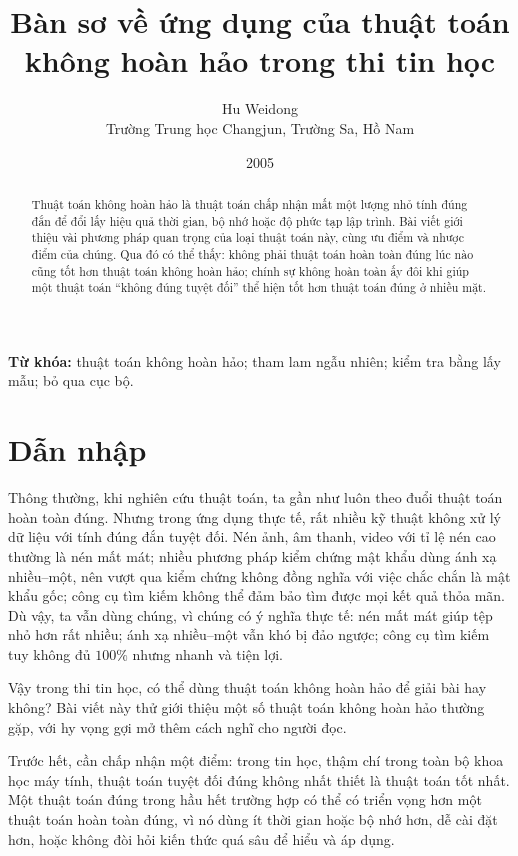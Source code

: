 \documentclass[11pt]{article}
\title{Bàn sơ về ứng dụng của thuật toán không hoàn hảo trong thi tin học}
\author{Hu Weidong\\Trường Trung học Changjun, Trường Sa, Hồ Nam}
\date{2005}
\begin{document}
\maketitle


\renewcommand{\abstractname}{Tóm tắt}
\begin{abstract}
Thuật toán không hoàn hảo là thuật toán chấp nhận mất một lượng nhỏ tính đúng
đắn để đổi lấy hiệu quả thời gian, bộ nhớ hoặc độ phức tạp lập trình. Bài viết
giới thiệu vài phương pháp quan trọng của loại thuật toán này, cùng ưu điểm và
nhược điểm của chúng. Qua đó có thể thấy: không phải thuật toán hoàn toàn đúng
lúc nào cũng tốt hơn thuật toán không hoàn hảo; chính sự không hoàn toàn ấy
đôi khi giúp một thuật toán ``không đúng tuyệt đối'' thể hiện tốt hơn thuật
toán đúng ở nhiều mặt.
\end{abstract}

\noindent\textbf{Từ khóa:} thuật toán không hoàn hảo; tham lam ngẫu nhiên;
kiểm tra bằng lấy mẫu; bỏ qua cục bộ.

\section{Dẫn nhập}

Thông thường, khi nghiên cứu thuật toán, ta gần như luôn theo đuổi thuật toán
hoàn toàn đúng. Nhưng trong ứng dụng thực tế, rất nhiều kỹ thuật không xử lý
dữ liệu với tính đúng đắn tuyệt đối. Nén ảnh, âm thanh, video với tỉ lệ nén
cao thường là nén mất mát; nhiều phương pháp kiểm chứng mật khẩu dùng ánh xạ
nhiều--một, nên vượt qua kiểm chứng không đồng nghĩa với việc chắc chắn là mật
khẩu gốc; công cụ tìm kiếm không thể đảm bảo tìm được mọi kết quả thỏa mãn.
Dù vậy, ta vẫn dùng chúng, vì chúng có ý nghĩa thực tế: nén mất mát giúp tệp
nhỏ hơn rất nhiều; ánh xạ nhiều--một vẫn khó bị đảo ngược; công cụ tìm kiếm
tuy không đủ $100\%$ nhưng nhanh và tiện lợi.

Vậy trong thi tin học, có thể dùng thuật toán không hoàn hảo để giải bài hay
không? Bài viết này thử giới thiệu một số thuật toán không hoàn hảo thường
gặp, với hy vọng gợi mở thêm cách nghĩ cho người đọc.

Trước hết, cần chấp nhận một điểm: trong tin học, thậm chí trong toàn bộ khoa
học máy tính, thuật toán tuyệt đối đúng không nhất thiết là thuật toán tốt
nhất. Một thuật toán đúng trong hầu hết trường hợp có thể có triển vọng hơn
một thuật toán hoàn toàn đúng, vì nó dùng ít thời gian hoặc bộ nhớ hơn, dễ cài
đặt hơn, hoặc không đòi hỏi kiến thức quá sâu để hiểu và áp dụng.
\end{document}
